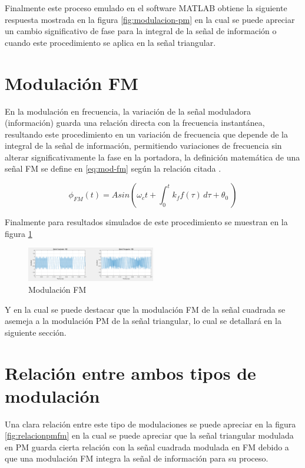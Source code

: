 \documentclass[conference]{IEEEtran}
\begin{document}
	Finalmente este proceso emulado en el software MATLAB obtiene la siguiente respuesta mostrada en la figura \ref{fig:modulacion-pm} en la cual se puede apreciar un cambio significativo de fase para la integral de la señal de información o cuando este procedimiento se aplica en la señal triangular.
	
	\section{ Modulación FM}
	
	En la modulación en frecuencia, la variación de la señal moduladora (información) guarda una relación directa con la frecuencia instantánea, resultando este procedimiento en un variación de frecuencia que depende de la integral de la señal de información, permitiendo variaciones de frecuencia sin alterar significativamente la fase en la portadora, la definición matemática de una señal FM se define en \ref{eq:mod-fm} según la relación citada \cite{stremler2006}.
		
	\begin{equation}
		\phi_{FM}(t) = Asin( \omega_c t + \int_0^t k_f f(\tau)\, d\tau + \theta_0\ )
		\label{eq:mod-fm}
	\end{equation}
	
	Finalmente para resultados simulados de este procedimiento se muestran en la figura \ref{fig:modulacion-fm-sim}
	
	\begin{figure}[h]
		\centering
		\includegraphics[width=0.5\textwidth]{media/modulacion-fm-sim}
		\caption{Modulación FM}
		\label{fig:modulacion-fm-sim}
	\end{figure}
	
	Y en la cual se puede destacar que la modulación FM de la señal cuadrada se asemeja a la modulación PM de la señal triangular, lo cual se detallará en la siguiente sección.
	
	\section{Relación entre ambos tipos de modulación}
	
	Una clara relación entre este tipo de modulaciones se puede apreciar en la figura \ref{fig:relacionpmfm} en la cual se puede apreciar que la señal triangular modulada en PM guarda cierta relación con la señal cuadrada modulada en FM debido a que una modulación FM integra la señal de información para su proceso.
	
\end{document}
